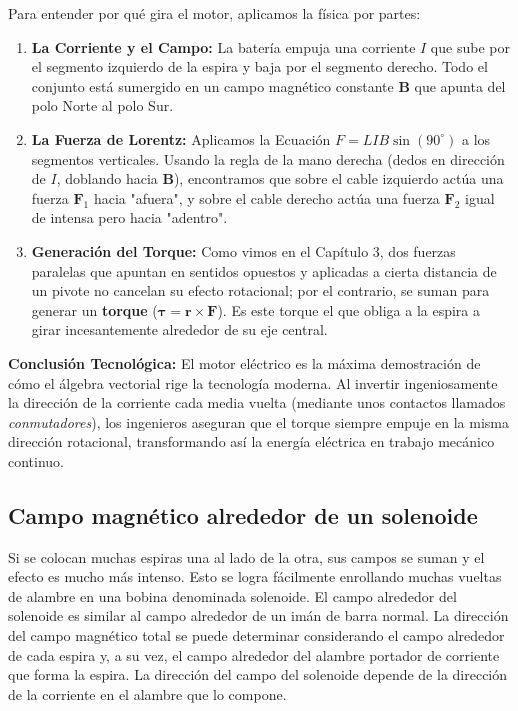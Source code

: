 \documentclass[11pt,a4paper]{book}
\begin{document}
Para entender por qué gira el motor, aplicamos la física por partes:
\begin{enumerate}
    \item \textbf{La Corriente y el Campo:} La batería empuja una corriente $I$ que sube por el segmento izquierdo de la espira y baja por el segmento derecho. Todo el conjunto está sumergido en un campo magnético constante $\boldsymbol{B}$ que apunta del polo Norte al polo Sur.
    \item \textbf{La Fuerza de Lorentz:} Aplicamos la Ecuación $F = LIB \sin(90^\circ)$ a los segmentos verticales. Usando la regla de la mano derecha (dedos en dirección de $I$, doblando hacia $\boldsymbol{B}$), encontramos que sobre el cable izquierdo actúa una fuerza $\boldsymbol{F}_1$ hacia "afuera", y sobre el cable derecho actúa una fuerza $\boldsymbol{F}_2$ igual de intensa pero hacia "adentro".
    \item \textbf{Generación del Torque:} Como vimos en el Capítulo 3, dos fuerzas paralelas que apuntan en sentidos opuestos y aplicadas a cierta distancia de un pivote no cancelan su efecto rotacional; por el contrario, se suman para generar un \textbf{torque} ($\boldsymbol{\tau} = \boldsymbol{r} \times \boldsymbol{F}$). Es este torque el que obliga a la espira a girar incesantemente alrededor de su eje central.
\end{enumerate}

\textbf{Conclusión Tecnológica:} 
El motor eléctrico es la máxima demostración de cómo el álgebra vectorial rige la tecnología moderna. Al invertir ingeniosamente la dirección de la corriente cada media vuelta (mediante unos contactos llamados \textit{conmutadores}), los ingenieros aseguran que el torque siempre empuje en la misma dirección rotacional, transformando así la energía eléctrica en trabajo mecánico continuo.


\subsection{Campo magnético alrededor de un solenoide}  

Si se colocan muchas espiras una al lado de la otra, sus campos se suman y el efecto es mucho más intenso. Esto se logra fácilmente enrollando muchas vueltas de alambre en una bobina denominada solenoide. El campo alrededor del solenoide es similar al campo alrededor de un imán de barra normal. La dirección del campo magnético total se puede determinar considerando el campo alrededor de cada espira y, a su vez, el campo alrededor del alambre portador de corriente que forma la espira. La dirección del campo del solenoide depende de la dirección de la corriente en el alambre que lo compone.
\end{document}
